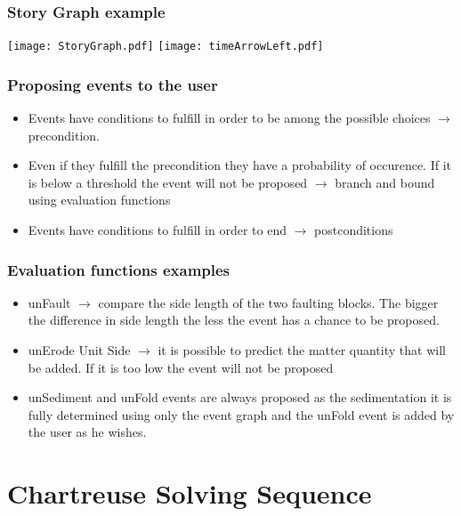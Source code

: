 \documentclass{beamer}
\begin{document}
    \begin{frame} 
    \frametitle{Story Graph example}
    \texttt{[image: StoryGraph.pdf]}
    \linebreak
    \linebreak
    \texttt{[image: timeArrowLeft.pdf]}
    \end{frame}
	
	\begin{frame}
	\frametitle{Proposing events to the user}
	\begin{itemize}
	\item Events have conditions to fulfill in order to be among the possible choices $\rightarrow$ precondition.
	\item Even if they fulfill the precondition they have a probability of occurence. If it is below a threshold the event will not be proposed $\rightarrow$  branch and bound using evaluation functions
	\item Events have conditions to fulfill in order to end $\rightarrow$  postconditions
	\end{itemize}
	\end{frame}
	
	\begin{frame}
	\frametitle{Evaluation functions examples}
	\begin{itemize}
	\item unFault $\rightarrow$  compare the side length of the two faulting blocks. The bigger the difference in side length the less the event has a chance to be proposed.
	\item unErode Unit Side $\rightarrow$  it is possible to predict the matter quantity that will be added. If it is too low the event will not be proposed
	\item unSediment and unFold events are always proposed as the sedimentation it is fully determined using only the event graph and the unFold event is added by the user as he wishes.
	\end{itemize}
	\end{frame}	
	
	\section{Chartreuse Solving Sequence}
\end{document}
